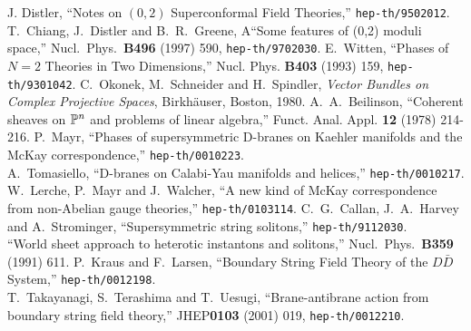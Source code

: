 \documentclass[a4paper,12pt]{article}
\begin{document}
\begin{thebibliography}{99}
J. Distler, ``Notes on $(0,2)$ Superconformal Field Theories,''
{\tt hep-th/9502012}. \\
T.~Chiang, J.~Distler and B.~R.~Greene,
A``Some features of (0,2) moduli space,'' Nucl.\ Phys.\ {\bf B496}
(1997)
590, {\tt hep-th/9702030}.
E.~Witten, ``Phases of $N=2$ Theories in Two Dimensions,''
Nucl. Phys. {\bf B403} (1993) 159, {\tt hep-th/9301042}.
 C.~Okonek, M.~Schneider and H.~Spindler, {\em Vector
Bundles on Complex Projective Spaces}, Birkh\"auser, Boston, 1980.
A.~A.~Beilinson, ``Coherent sheaves on $\mathbb P^n$ and
problems of linear algebra,'' Funct. Anal. Appl. {\bf 12}
(1978) 214-216.
 P.~Mayr, 
``Phases of supersymmetric D-branes on Kaehler manifolds and the McKay
correspondence,'' {\tt hep-th/0010223}. \\
A.~Tomasiello, ``D-branes on Calabi-Yau manifolds and helices,''
{\tt hep-th/0010217}.\\      
W.~Lerche, P.~Mayr and J.~Walcher,
``A new kind of McKay correspondence from non-Abelian gauge theories,''
{\tt hep-th/0103114}.
C.~G.~Callan, J.~A.~Harvey and A.~Strominger,
``Supersymmetric string solitons,''
{\tt hep-th/9112030}. \\
``World sheet approach to heterotic instantons and solitons,''
Nucl.\ Phys.\ {\bf B359} (1991) 611.
P.~Kraus and F.~Larsen,
``Boundary String Field Theory of the $D\bar{D}$ System,''
{\tt hep-th/0012198}. \\
T.~Takayanagi, S.~Terashima and T.~Uesugi,
``Brane-antibrane action from boundary string field theory,''
JHEP{\bf 0103} (2001) 019,
{\tt hep-th/0012210}.
\end{thebibliography}
\end{document}
